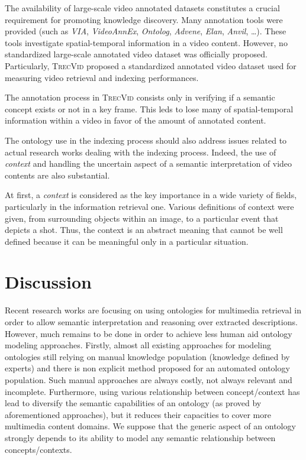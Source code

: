 		The availability of large-scale video annotated datasets constitutes a crucial requirement 
		for promoting knowledge discovery. Many annotation tools were provided \citep{Dasiopoulou2011}
		(such as \emph{VIA}, \emph{VideoAnnEx}, \emph{Ontolog}, \emph{Advene}, \emph{Elan}, \emph{Anvil},
		 \dots). These tools investigate spatial-temporal information in a video content. However,
		no standardized large-scale annotated video dataset was officially proposed. Particularly, 
		\textsc{TrecVid} \cite{Over2013} proposed a standardized annotated video dataset used for
		measuring video retrieval and indexing performances. 

		The annotation process in \textsc{TrecVid} \cite{Ayache2008} consists only in verifying 
		if a semantic concept exists or not in a key frame. This leds to lose many of spatial-temporal 
		information within a video in favor of the amount of annotated content. 

		The ontology use in the indexing process should also address issues related to actual 
		research works dealing with the indexing process. Indeed, the use of \emph{context} 
		and handling  the uncertain aspect of a semantic interpretation of video contents are also substantial. 

		At first, a \emph{context} is considered as the key importance in a wide variety of fields, 
		particularly in the information retrieval one. Various definitions of context were given, 
		from surrounding objects within an image, to a particular event that depicts a shot. 
		Thus, the context is an abstract meaning that cannot be well defined because it can be 
		meaningful only in a particular situation. 

	



\section{Discussion}
	Recent research works are focusing on using ontologies for multimedia retrieval in order to
	allow semantic interpretation and reasoning over extracted descriptions. However, much remains to 
	be done in order to achieve less human aid ontology modeling approaches. Firstly, almost all existing 
	approaches for modeling ontologies still relying on manual knowledge population (knowledge defined by
	experts) and there is non explicit method proposed for an automated ontology population. Such manual
	approaches are always costly, not always relevant and incomplete. Furthermore, using various relationship
	between concept/context has lead to diversify the semantic capabilities of an ontology (as proved by
	aforementioned approaches), but it reduces their capacities to cover more multimedia content domains. We
	suppose that the generic aspect of an ontology strongly depends to its ability to model any semantic
	relationship between concepts/contexts. 

